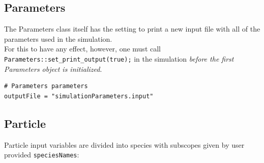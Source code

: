 \documentclass[11pt]{article}
\begin{document}
\subsection{Parameters}
The Parameters class itself has the setting to print a new input file with all of the parameters used in the simulation.\\
For this to have any effect, however, one must call \lstinline|Parameters::set_print_output(true);| in the simulation \emph{before the first Parameters object is initialized}.
\begin{lstlisting}[language=pkgconfig]
# Parameters parameters
outputFile = "simulationParameters.input"
\end{lstlisting}

\subsection{Particle}\label{sec:ParticleInput}
Particle input variables are divided into species with subscopes given by user provided \verb|speciesNames|:
\end{document}
